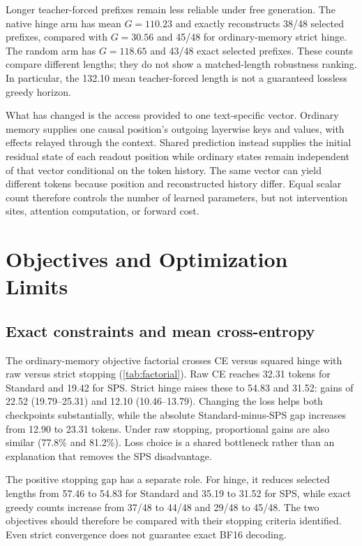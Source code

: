 \documentclass{article}
\begin{document}
Longer teacher-forced prefixes remain less reliable under free generation.
The native hinge arm has mean $G=110.23$ and exactly reconstructs 38/48 selected prefixes, compared with $G=30.56$ and 45/48 for ordinary-memory strict hinge.
The random arm has $G=118.65$ and 43/48 exact selected prefixes.
These counts compare different lengths; they do not show a matched-length robustness ranking.
In particular, the 132.10 mean teacher-forced length is not a guaranteed lossless greedy horizon.

What has changed is the access provided to one text-specific vector.
Ordinary memory supplies one causal position's outgoing layerwise keys and values, with effects relayed through the context.
Shared prediction instead supplies the initial residual state of each readout position while ordinary states remain independent of that vector conditional on the token history.
The same vector can yield different tokens because position and reconstructed history differ.
Equal scalar count therefore controls the number of learned parameters, but not intervention sites, attention computation, or forward cost.

\section{Objectives and Optimization Limits}
\label{sec:controls}

\subsection{Exact constraints and mean cross-entropy}

The ordinary-memory objective factorial crosses CE versus squared hinge with raw versus strict stopping (\cref{tab:factorial}).
Raw CE reaches 32.31 tokens for Standard and 19.42 for SPS.
Strict hinge raises these to 54.83 and 31.52: gains of 22.52 (19.79--25.31) and 12.10 (10.46--13.79).
Changing the loss helps both checkpoints substantially, while the absolute Standard-minus-SPS gap increases from 12.90 to 23.31 tokens.
Under raw stopping, proportional gains are also similar (77.8\% and 81.2\%).
Loss choice is a shared bottleneck rather than an explanation that removes the SPS disadvantage.

The positive stopping gap has a separate role.
For hinge, it reduces selected lengths from 57.46 to 54.83 for Standard and 35.19 to 31.52 for SPS, while exact greedy counts increase from 37/48 to 44/48 and 29/48 to 45/48.
The two objectives should therefore be compared with their stopping criteria identified.
Even strict convergence does not guarantee exact BF16 decoding.
\end{document}
